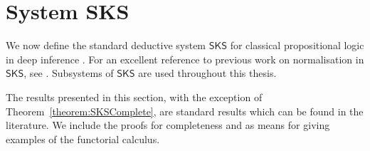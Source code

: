 \newcommand{\SKS}{\mathsf{SKS}}

\section{System SKS}

We now define the standard deductive system $\SKS$\index{$\SKS$} for classical propositional logic in deep inference  \cite{Brun:03:Atomic-C:oz,Brun:06:Cut-Elim:cq,Brun:06:Locality:zh,BrunTiu:01:A-Local-:mz}. For an excellent reference to previous work on normalisation in $\SKS$, see \cite{Brun:04:Deep-Inf:rq}. Subsystems of $\SKS$ are used throughout this thesis.

The results presented in this section, with the exception of Theorem~\vref{theorem:SKSComplete}, are standard results which can be found in the literature. We include the proofs for completeness and as means for giving examples of the functorial calculus.

\renewcommand{\mathsf}{\mathbf}

\newcommand{\ai   }{{\mathsf{ai}}}
\newcommand{\aw   }{{\mathsf{aw}}}
\newcommand{\ac   }{{\mathsf{ac}}}
\newcommand{\aid  }{{\ai{\downarrow}}}
\newcommand{\awd  }{{\aw{\downarrow}}}
\newcommand{\acd  }{{\ac{\downarrow}}}
\newcommand{\aiu  }{{\ai{\uparrow}}}
\newcommand{\awu  }{{\aw{\uparrow}}}
\newcommand{\acu  }{{\ac{\uparrow}}}
\newcommand{\swi  }{\mathsf{s}}
\newcommand{\med  }{\mathsf{m}}
\newcommand{\asor }{{=_\mathsf{a}{\downarrow}}}
\newcommand{\asand}{{=_\mathsf{a}{\uparrow}}}
\newcommand{\coor }{{=_{\vee\mathsf{c}}}}
\newcommand{\coand}{{=_{\wedge\mathsf{c}}}}
\newcommand{\fffd }{{{=_{\fff}}{\downarrow}}}
\newcommand{\fffu }{{{=_{\fff}}{\uparrow}}}
\newcommand{\tttd }{{{=_{\ttt}}{\downarrow}}}
\newcommand{\tttu }{{{=_{\ttt}}{\uparrow}}}
\newcommand{\tttord }{{{=_{\ttt\vee}}{\downarrow}}}
\newcommand{\fffandd }{{{=_{\fff\wedge}}{\downarrow}}}
\newcommand{\tttoru }{{{=_{\ttt\vee}}{\uparrow}}}
\newcommand{\fffandu }{{{=_{\fff\wedge}}{\uparrow}}}


